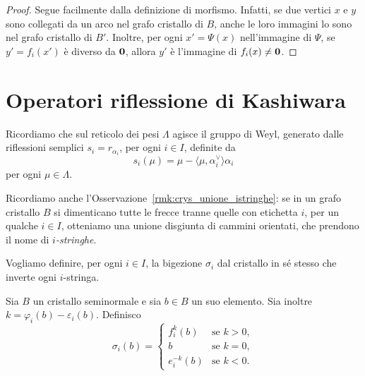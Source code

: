 \begin{proof}
    Segue facilmente dalla definizione di morfismo.
    Infatti, se due vertici $x$ e $y$ sono collegati da un arco nel grafo
    cristallo di $B$, anche le loro immagini lo sono nel grafo cristallo di $B'$.
    Inoltre, per ogni $x' = \Psi(x)$ nell'immagine di $\Psi$, se 
    $y' = f_i(x')$ \`e diverso da $\mathbf{0}$, allora $y'$ \`e l'immagine di $f_i(x) \neq \mathbf{0}$.
\end{proof}


\section{Operatori riflessione di Kashiwara}

Ricordiamo che sul reticolo dei pesi $\Lambda$ agisce il gruppo di Weyl, generato dalle
riflessioni semplici $s_i = r_{\alpha_i}$, per ogni $i \in I$, definite da
\[
    s_i (\mu) = \mu - \langle \mu , \alpha_i^\vee \rangle \alpha_i
\]
per ogni $\mu \in \Lambda$.

Ricordiamo anche l'Osservazione~\ref{rmk:crys_unione_istringhe}:
se in un grafo cristallo $B$ si dimenticano tutte le frecce tranne quelle
con etichetta $i$, per un qualche $i \in I$, otteniamo una unione disgiunta
di cammini orientati, che prendono il nome di \emph{$i$-stringhe}.

Vogliamo definire, per ogni $i\in I$, la bigezione $\sigma_i$ dal cristallo in s\'e 
stesso che inverte ogni $i$-stringa.

\begin{definition}
    Sia $B$ un cristallo seminormale e sia $b \in B$ un suo elemento.
    Sia inoltre 
    $k =  \varphi_i(b) - \varepsilon_i(b)$.
    Definisco
    \[
        \sigma_i(b) = \begin{cases}
            f_i^k (b) & \text{se $k>0$}, \\
            b         & \text{se $k=0$}, \\
            e_i^{-k} (b) & \text{se $k<0$}.
        \end{cases}
    \]
\end{definition}

